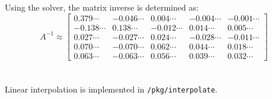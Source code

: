 \documentclass[12pt, a4paper]{article}
\begin{document}
  \subsection{}
  Using the solver, the matrix inverse is determined as:
  \begin{equation}
    A^{-1} \approx \begin{bmatrix}0.379\cdots & -0.046\cdots & 0.004\cdots & -0.004\cdots & -0.001\cdots \\ -0.138\cdots & 0.138\cdots & -0.012\cdots & 0.014\cdots & 0.005\cdots \\ 0.027\cdots & -0.027\cdots & 0.024\cdots & -0.028\cdots & -0.011\cdots \\ 0.070\cdots & -0.070\cdots & 0.062\cdots & 0.044\cdots & 0.018\cdots \\ 0.063\cdots & -0.063\cdots & 0.056\cdots & 0.039\cdots & 0.032\cdots\end{bmatrix}
  \end{equation}

\section{}
  \subsection{}
  Linear interpolation is implemented in \texttt{/pkg/interpolate}.

  
\end{document}

